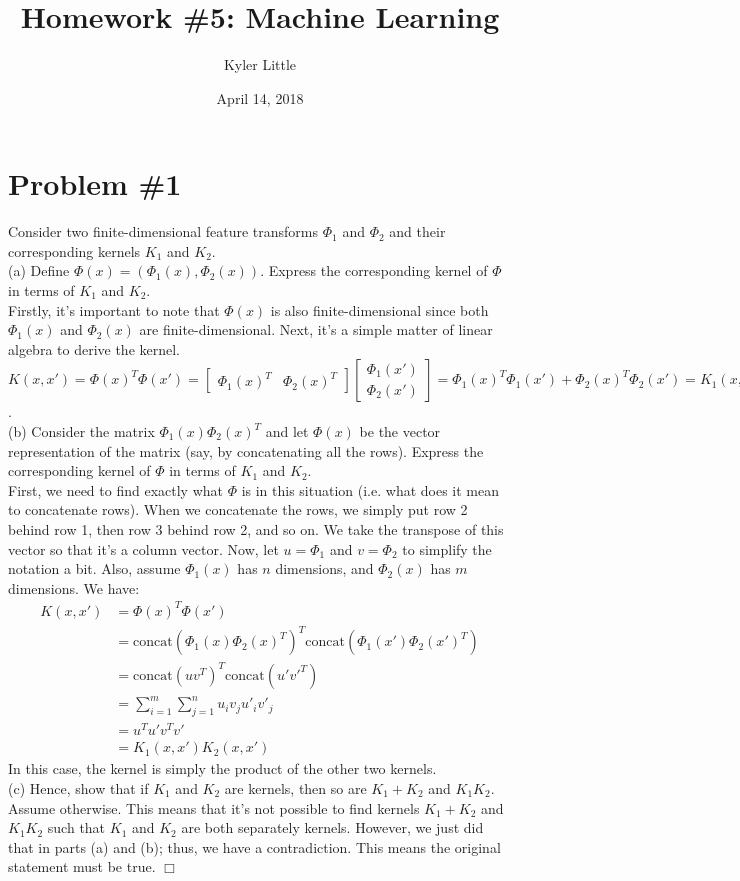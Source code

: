 \documentclass[12pt]{article}
\author{Kyler Little\vspace{-0.6cm}}
\title{Homework \#5: Machine Learning\vspace{-0.3cm}}
\date{April 14, 2018\vspace{-0.7cm}}
\begin{document}
	\maketitle
	\section*{Problem \#1}
	Consider two finite-dimensional feature transforms $\Phi_1$ and $\Phi_2$ and their corresponding kernels $K_1$ and $K_2$. \\
	(a) Define $\Phi(x) = (\Phi_1(x), \Phi_2(x))$. Express the corresponding kernel of $\Phi$ in terms of $K_1$ and $K_2$. \\
	Firstly, it's important to note that $\Phi(x)$ is also finite-dimensional since both $\Phi_1(x)$ and $\Phi_2(x)$ are finite-dimensional. Next, it's a simple matter of linear algebra to derive the kernel. \\ $K(x,x')=\Phi(x)^T\Phi(x')=\left[\begin{array}{cc}\Phi_1(x)^T&\Phi_2(x)^T\end{array}\right]\left[\begin{array}{c}\Phi_1(x') \\ \Phi_2(x')\end{array}\right] = \Phi_1(x)^T \Phi_1(x') + \Phi_2(x)^T \Phi_2(x') = K_1(x,x')+K_2(x,x')$. 
	\\
	(b) Consider the matrix $\Phi_1(x) \Phi_2(x)^T$ and let $\Phi(x)$ be the vector representation of the matrix (say, by concatenating all the rows). Express the corresponding kernel of $\Phi$ in terms of $K_1$ and $K_2$. \\
	First, we need to find exactly what $\Phi$ is in this situation (i.e. what does it mean to concatenate rows). When we concatenate the rows, we simply put row 2 behind row 1, then row 3 behind row 2, and so on. We take the transpose of this vector so that it's a column vector. Now, let $u = \Phi_1$ and $v= \Phi_2$ to simplify the notation a bit. Also, assume $\Phi_1(x)$ has $n$ dimensions, and $\Phi_2(x)$ has $m$ dimensions. We have:
	\begin{align*}
		K(x,x') &= \Phi(x)^T\Phi(x') \\
		&= \text{concat}(\Phi_1(x) \Phi_2(x)^T)^T \text{concat}(\Phi_1(x') \Phi_2(x')^T) \\
		&= \text{concat}(uv^T)^T \text{concat}(u'v'^T) \\
		&= \sum_{i=1}^{m} \sum_{j=1}^{n} u_i v_j u'_i v'_j \\
		&= u^T u' v^T v' \\
		&= K_1(x,x') K_2(x,x')
	\end{align*}
	In this case, the kernel is simply the product of the other two kernels. \\
	(c) Hence, show that if $K_1$ and $K_2$ are kernels, then so are $K_1 + K_2$ and $K_1 K_2$. \\
	Assume otherwise. This means that it's not possible to find kernels $K_1+K_2$ and $K_1 K_2$ such that $K_1$ and $K_2$ are both separately kernels. However, we just did that in parts (a) and (b); thus, we have a contradiction. This means the original statement must be true. $\Box$
	
\end{document}

